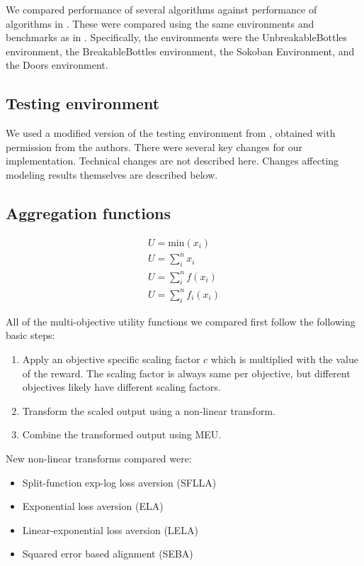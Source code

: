 We compared performance of several algorithms against performance of algorithms in \cite{vamplew_potential-based_2021}. These were compared using the same environments and benchmarks as in \cite{vamplew_potential-based_2021}. Specifically, the environments were the UnbreakableBottles environment, the BreakableBottles environment, the Sokoban Environment, and the Doors environment.
\subsection{Testing environment}

We used a modified version of the testing environment from \cite{vamplew_potential-based_2021}, obtained with permission from the authors. There were several key changes for our implementation. Technical changes are not described here. Changes affecting modeling results themselves are described below.



\subsection{Aggregation functions}

\begin{align}
U=\text{min}({x_i}) \\
U=\sum_{i}^n{x_i} \\
U=\sum_{i}^n{f(x_i)} \\
U=\sum_{i}^n{f_i(x_i)}
\end{align}

All of the multi-objective utility functions we compared first follow the following basic steps:
\begin{enumerate}

    \item Apply an objective specific scaling factor $c$ which is multiplied with the value of the reward. The scaling factor is always same per objective, but different objectives likely have different scaling factors.
    \item Transform the scaled output using a non-linear transform. %
    \item Combine the transformed output using MEU.
\end{enumerate}

 New non-linear transforms compared were:

\begin{itemize}
    \item Split-function exp-log loss aversion (SFLLA)
    \item Exponential loss aversion (ELA)
    \item Linear-exponential loss aversion (LELA)
    \item Squared error based alignment (SEBA)
\end{itemize}

